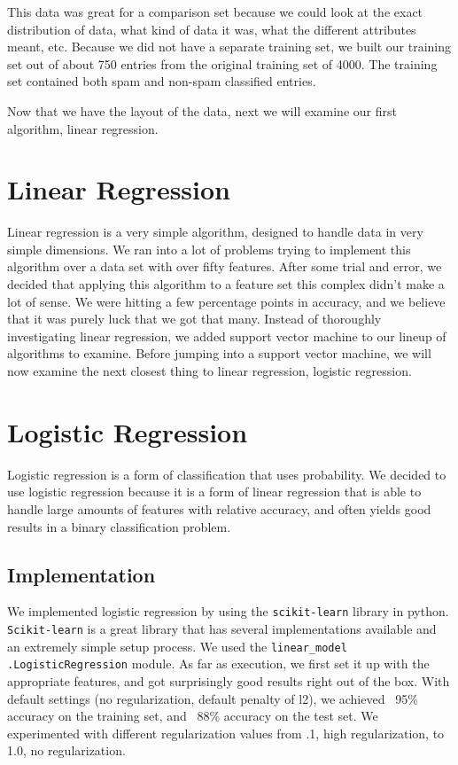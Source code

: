 \documentclass[10pt,letterpaper,onecolumn,draftclsnofoot]{IEEEtran}
\begin{document}
This data was great for a comparison set because we could look at the exact distribution
of data, what kind of data it was, what the different attributes meant, etc. Because we
did not have a separate training set, we built our training set out of about 750 entries
from the original training set of 4000. The training set contained both spam and non-spam
classified entries.

Now that we have the layout of the data, next we will examine our first algorithm,
linear regression.

\section{Linear Regression}
Linear regression is a very simple algorithm, designed to handle data in very simple
dimensions. We ran into a lot of problems trying to implement this algorithm over
a data set with over fifty features. After some trial and error, we decided that
applying this algorithm to a feature set this complex didn't make a lot of sense.
We were hitting a few percentage points in accuracy, and we believe that it was
purely luck that we got that many. Instead of thoroughly investigating linear regression,
we added support vector machine to our lineup of algorithms to examine. Before
jumping into a support vector machine, we will now examine the next closest thing
to linear regression, logistic regression.

\section{Logistic Regression}
Logistic regression is a form of classification that uses probability. We decided
to use logistic regression because it is a form of linear regression that is able
to handle large amounts of features with relative accuracy, and often yields good
results in a binary classification problem. 
	\subsection{Implementation}
	We implemented logistic regression by using the \texttt{scikit-learn} library
	in python. \texttt{Scikit-learn} is a great library that has several implementations
	available and an extremely simple setup process. We used the \texttt{linear\_model}
	\texttt{.LogisticRegression} module. As far as execution, we first set it up with
	the appropriate features, and got surprisingly good results right out of the box.
	With default settings (no regularization, default penalty of l2), we achieved
	~95\% accuracy on the training set, and ~88\% accuracy on the test set. We
	experimented with different regularization values from .1, high regularization,
	to 1.0, no regularization.
	 
\end{document}
